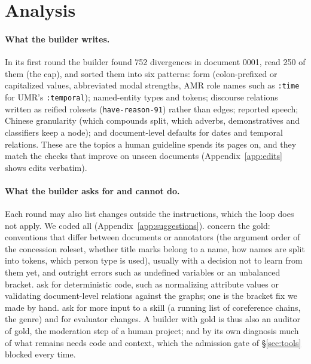 \section{Analysis}
\label{sec:analysis}

\paragraph{What the builder writes.}
In its first round the builder found 752 divergences in document 0001, read 250 of them (the cap), and sorted them into six patterns: form (colon-prefixed or capitalized values, abbreviated modal strengths, AMR role names such as \texttt{:time} for UMR's \texttt{:temporal}); named-entity types and tokens; discourse relations written as reified rolesets (\texttt{have-reason-91}) rather than edges; reported speech; Chinese granularity (which compounds split, which adverbs, demonstratives and classifiers keep a node); and document-level defaults for dates and temporal relations. These are the topics a human guideline spends its pages on, and they match the checks that improve on unseen documents (Appendix~\ref{app:edits} shows edits verbatim).

\paragraph{What the builder asks for and cannot do.}
Each round may also list changes outside the instructions, which the loop does not apply. We coded all \nSuggestions{} (Appendix~\ref{app:suggestions}). \sugGold{} concern the gold: conventions that differ between documents or annotators (the argument order of the concession roleset, whether title marks belong to a name, how names are split into tokens, which person type is used), usually with a decision not to learn from them yet, and outright errors such as undefined variables or an unbalanced bracket. \sugRule{} ask for deterministic code, such as normalizing attribute values or validating document-level relations against the graphs; one is the bracket fix we made by hand. \sugContext{} ask for more input to a skill (a running list of coreference chains, the genre) and \sugEval{} for evaluator changes. A builder with gold is thus also an auditor of gold, the moderation step of a human project; and by its own diagnosis much of what remains needs code and context, which the admission gate of \S\ref{sec:tools} blocked every time.

